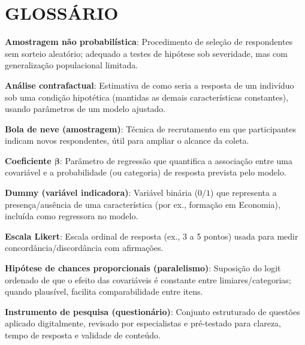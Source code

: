 






\chapter*{GLOSSÁRIO}

{ \setlength{\parindent}{0pt}%
  \setlength{\parskip}{\baselineskip} %

\textbf{Amostragem não probabilística}: Procedimento de seleção de respondentes sem sorteio aleatório; adequado a testes de hipótese sob severidade, mas com generalização populacional limitada. 

\textbf{Análise contrafactual}: Estimativa de como seria a resposta de um indivíduo sob uma condição hipotética (mantidas as demais características constantes), usando parâmetros de um modelo ajustado.

\textbf{Bola de neve (amostragem)}: Técnica de recrutamento em que participantes indicam novos respondentes, útil para ampliar o alcance da coleta.

\textbf{Coeficiente $\boldsymbol\beta$}: Parâmetro de regressão que quantifica a associação entre uma covariável e a probabilidade (ou categoria) de resposta prevista pelo modelo.

\textbf{Dummy (variável indicadora)}: Variável binária ($0/1$) que representa a presença/ausência de uma característica (por ex., formação em Economia), incluída como regressora no modelo.

\textbf{Escala Likert}: Escala ordinal de resposta (ex., 3 a 5 pontos) usada para medir concordância/discordância com afirmações.

\textbf{Hipótese de chances proporcionais (paralelismo)}: Suposição do logit ordenado de que o efeito das covariáveis é constante entre limiares/categorias; quando plausível, facilita comparabilidade entre itens.

\textbf{Instrumento de pesquisa (questionário)}: Conjunto estruturado de questões aplicado digitalmente, revisado por especialistas e pré-testado para clareza, tempo de resposta e validade de conteúdo.

}
